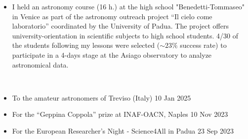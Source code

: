\begin{experiences}
    {
     \begin{itemize}
         \item I held an astronomy course (16 h.) at the high school "Benedetti-Tommaseo" in Venice as part of the astronomy outreach project ``Il cielo come laboratorio'' coordinated by the University of Padua. The project offers university-orientation in scientific subjects to high school students. 4/30 of the students following my lessons were selected ($\sim 23 \%$ success rate) to participate in a 4-days stage at the Asiago observatory to analyze astronomical data.   %
     \end{itemize}}
     \\
    \emptySeparator

    \newpage
    {
     \begin{itemize}
         \item To the amateur astronomers of Treviso (Italy) \hfill 10 Jan 2025
         \item For the ``Geppina Coppola'' prize at INAF-OACN, Naples  \hfill 10 Nov 2023 %
         \item For the European Researcher's Night - Science4All in Padua  \hfill 23 Sep 2023
     \end{itemize}}
\end{experiences}